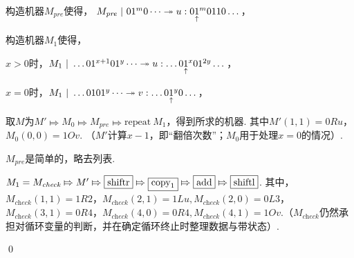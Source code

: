 \newcommand{\Mpre}{M_\textit{pre}}
\newcommand{\Mcheck}{M_\textit{check}}

\begin{pf} \rm\;  

    构造机器$\Mpre$使得，
    $\Mpre\sepline 01^{m}0\dots\twoheadrightarrow u:0\pointer{1}^{m}0110\dots$，
    
    构造机器$M_1$使得，

    $x > 0$时，$M_1\ | \  \dots 01^{x+1}01^{y}\dots\twoheadrightarrow u: \dots0\underset{\substack{\uparrow}}{1}^{x}01^{2y}\dots$，

    $x = 0$时，$M_1\ | \  \dots 0101^{y}\dots\twoheadrightarrow v: \dots0\underset{\substack{\uparrow}}{1}^{y}0\dots$，

    取$M$为$M' \Mapsto M_0 \Mapsto \Mpre \Mapsto \mathrm{repeat}\ M_1$，得到所求的机器. 其中$M'(1, 1) = 0Ru$，$M_0(0, 0) = 1Ov$. （$M'$计算$x-1$，即``翻倍次数''；$M_0$用于处理$x=0$的情况）.

    $\Mpre$是简单的，略去列表. 

    $M_1 = \Mcheck \Mapsto M' \Mapsto \shiftrB \Mapsto \copyB{1} \Mapsto \addB \Mapsto \shiftlB$. 其中，$\Mcheck(1, 1) = 1R2$，$\Mcheck(2, 1) = 1Lu, \Mcheck(2, 0) = 0L3$，$\Mcheck(3, 1) = 0R4$，$\Mcheck(4, 0) = 0R4, \Mcheck(4, 1) = 1Ov$.（$\Mcheck$仍然承担对循环变量的判断，并在确定循环终止时整理数据与带状态）.

    \qed
\end{pf}